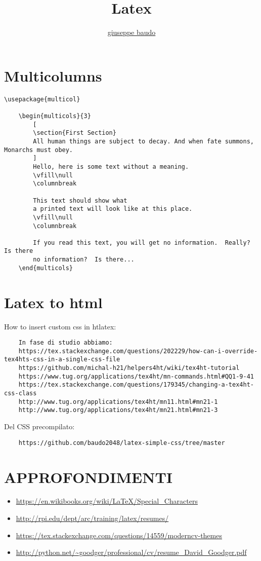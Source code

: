\documentclass[a4paper,10pt]{article}
\title{Latex}
\author{\href{http://www.baudo.hol.es}{giuseppe baudo}}
\begin{document}
  


\maketitle

\section*{Multicolumns}

\begin{verbatim}
\usepackage{multicol}

	\begin{multicols}{3}
		[
		\section{First Section}
		All human things are subject to decay. And when fate summons, Monarchs must obey.
		]
		Hello, here is some text without a meaning.  
		\vfill\null			
		\columnbreak
		
		This text should show what 
		a printed text will look like at this place.
		\vfill\null
		\columnbreak		
		
		If you read this text, you will get no information.  Really?  Is there 
		no information?  Is there...
	\end{multicols}
\end{verbatim}

\section*{Latex to html}
How to insert custom css in htlatex: 

\begin{verbatim}
	In fase di studio abbiamo:
	https://tex.stackexchange.com/questions/202229/how-can-i-override-tex4hts-css-in-a-single-css-file
	https://github.com/michal-h21/helpers4ht/wiki/tex4ht-tutorial
	https://www.tug.org/applications/tex4ht/mn-commands.html#QQ1-9-41
	https://tex.stackexchange.com/questions/179345/changing-a-tex4ht-css-class
	http://www.tug.org/applications/tex4ht/mn11.html#mn21-1
	http://www.tug.org/applications/tex4ht/mn21.html#mn21-3	
\end{verbatim}

Del CSS precompilato:

\begin{verbatim}
	https://github.com/baudo2048/latex-simple-css/tree/master
\end{verbatim}

\section{APPROFONDIMENTI}
\begin{itemize}
 \item \url{https://en.wikibooks.org/wiki/LaTeX/Special_Characters}
 \item \url{http://rpi.edu/dept/arc/training/latex/resumes/}
 \item \url{https://tex.stackexchange.com/questions/14559/moderncv-themes}
 \item \url{http://python.net/~goodger/professional/cv/resume_David_Goodger.pdf}
\end{itemize}
\end{document}
